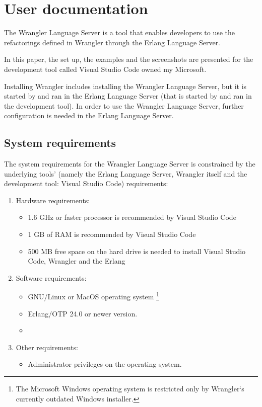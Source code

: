 \chapter{User documentation}
\label{ch:user}

The Wrangler Language Server is a tool that enables developers to use the refactorings defined in Wrangler through the Erlang Language Server.

In this paper, the set up, the examples and the screenshots are presented for the development tool called Visual Studio Code owned my Microsoft. 

Installing Wrangler includes installing the Wrangler Language Server, but it is started by and ran in the Erlang Language Server (that is started by and ran in the development tool). 
In order to use the Wrangler Language Server, further configuration is needed in the Erlang Language Server.

\section{System requirements}

The system requirements for the Wrangler Language Server is constrained by the underlying tools' (namely the Erlang Language Server, Wrangler itself and the development tool: Visual Studio Code) requirements:

\begin{enumerate}
    \item Hardware requirements: 
    \begin{itemize}
        \item 1.6 GHz or faster processor is recommended by Visual Studio Code 
        \cite{VSCodeRequirements}
        \item 1 GB of RAM is recommended by Visual Studio Code  \cite{VSCodeRequirements}
        \item 500 MB free space on the hard drive is needed to install Visual Studio Code, Wrangler and the Erlang
    \end{itemize}
    \item Software requirements:
    \begin{itemize}
        \item GNU/Linux or MacOS operating system \footnote{The Microsoft Windows operating system is restricted only by Wrangler`s currently outdated Windows installer.}
        \item Erlang/OTP 24.0 or newer version.
        \item {}
    \end{itemize}
    \item Other requirements:
    \begin{itemize}
        \item Administrator privileges on the operating system.
    \end{itemize}
\end{enumerate}


